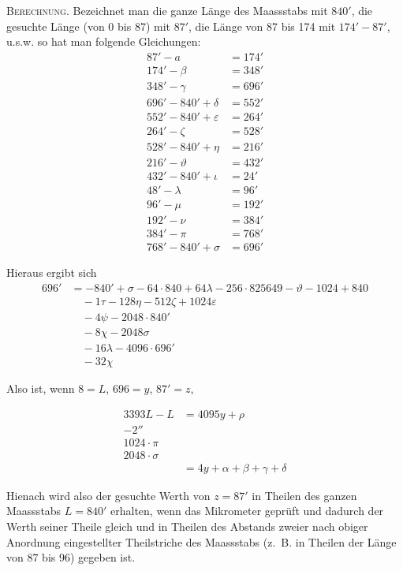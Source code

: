 \documentclass[fontsize=10pt,paper=a5,pagesize=auto]{scrbook}
\newcommand{\origpage}[1]{\marginpar{\footnotesize\textit{S. #1}}}
\begin{document}
\origpage{640}
\textsc{Berechnung.} Bezeichnet man die ganze Länge des Maassstabs mit $840'$, die gesuchte Länge (von 0 bis 87) mit $87'$, die Länge von 87 bis 174 mit $174' - 87'$, u.s.w. so hat man folgende Gleichungen:
\begin{align*}
87' - a &= 174'\\
174' - \beta &= 348'\\
348' - \gamma &= 696'\\
696' - 840' + \delta &= 552'\\
552' - 840' + \varepsilon &= 264'\\
264' - \zeta &= 528'\\
528' - 840' + \eta &= 216'\\
216' - \vartheta &= 432'\\
432' - 840' + \iota &= 24'\\
48' - \lambda &= 96'\\
96' - \mu &= 192'\\
192' - \nu &= 384'\\
384' - \pi &= 768'\\
768' - 840' + \sigma &= 696'
\end{align*}

Hieraus ergibt sich
\begin{align*}
696' &= -840' + \sigma - 64 \cdot 840 + 64\lambda - 256 \cdot 825649 - \vartheta - 1024 + 840\\
&\quad - 1\tau - 128\eta - 512\zeta + 1024\varepsilon\\
&\quad - 4\psi - 2048 \cdot 840'\\
&\quad - 8\chi - 2048\sigma\\
&\quad - 16\lambda - 4096 \cdot 696'\\
&\quad - 32\chi
\end{align*}

Also ist, wenn $8 = L$, $696 = y$, $87' = z$,

\origpage{641}
\begin{align*}
3393L - L &= 4095y + \rho\\
-2''\\
1024 \cdot \pi\\
2048 \cdot \sigma\\
&= 4y + \alpha + \beta + \gamma + \delta
\end{align*}

Hienach wird also der gesuchte Werth von $z = 87'$ in Theilen des ganzen Maassstabs $L = 840'$ erhalten, wenn das Mikrometer geprüft und dadurch der Werth seiner Theile gleich und in Theilen des Abstands zweier nach obiger Anordnung eingestellter Theilstriche des Maassstabs (z.~B. in Theilen der Länge von 87 bis 96) gegeben ist.
\end{document}
